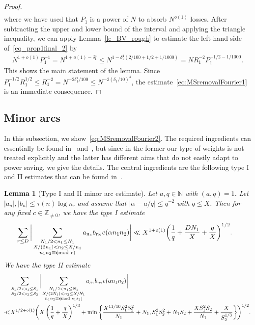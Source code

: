 \documentclass[12pt]{amsart}
\newtheorem{lemma}[theorem]{Lemma}
\theoremstyle{definition}
\theoremstyle{remark}
\numberwithin{equation}{section}
\newcommand{\1}{\mathbf{1}}
\newcommand{\Z}{{\mathbb Z}}
\let\oldpmod\pmod
\renewcommand{\pmod}[1]{\hspace{-0.12cm}\oldpmod {#1}}
\begin{document}
\begin{proof}
\begin{align}
\end{align}
where we have used that $P_1$ is a power of $N$ to absorb $N^{o(1)}$ losses. After subtracting the upper and lower bound of the interval and applying the triangle inequality, we can apply Lemma~\ref{le_BV_rough} to estimate the left-hand side of~\eqref{eq_prop1final_2} by
\begin{align*}
    N^{1+o(1)}P_1^{-1}=N^{1+o(1)-\delta_1^4}\leq N^{1-\delta_1^4(2/100+1/2+1/1000)}= NR_1^{-2}P_1^{-1/2-1/1000}.
\end{align*}
This shows the main statement of the lemma. Since $P_1^{-1/2}R_1^{1/2}\leq R_1^{-2}=N^{-2\delta_1^4/100}\leq N^{-3(\delta_1/10)^4}$, the estimate~\eqref{eq:MSremovalFourier1} is an immediate consequence.
\end{proof}


\subsection{Minor arcs}

In this subsection, we show~\eqref{eq:MSremovalFourier2}. The required ingredients can essentially be found in~\cite{matomaki} and~\cite{matomaki-shao}, but since in the former our type of weights is not treated explicitly and the latter has different aims that do not easily adapt to power saving, we give the details. The central ingredients are the following type I and II estimates that can be found in~\cite{matomaki}. 

 \begin{lemma}[Type I and II minor arc estimate] \label{lem:t1t2minor}
 Let $a,q\in \mathbb{N}$ with $(a,q)=1$. Let $|a_n|,|b_n|\leq \tau(n)\log n$, and assume that $|\alpha-a/q|\leq q^{-2}$ with $q\leq X$. Then for any fixed $c\in \Z_{\neq 0}$, we have the type I estimate 
 \begin{align}
     &\sum_{r\leq D} \bigg| \sum_{\substack{N_1/2 < n_1 \leq N_1\\ X/(2n_1)<n_2\leq X/n_1\\ n_1n_2\equiv c \pmod{r}}} a_{n_1} b_{n_2} e(\alpha n_1n_2) \bigg|\ll X^{1+o(1)} \bigg(\frac{1}{q}+\frac{DN_1}{X}+\frac{q}{X} \bigg)^{1/2}. \label{eq:typIminor}
\end{align}
We have the type II estimate 
     \begin{align}
    &\sum_{\substack{S_1/2 < s_1 \leq  S_1\\ S_2/2 < s_2 \leq  S_2}}\bigg| \sum_{\substack{N_1/2 < n_1 \leq N_1 \\ X/(2N_1) < n_2\leq X/N_1\\ n_1n_2\equiv c \pmod{s_1s_2}}} a_{n_1} b_{n_2} e(\alpha n_1n_2) \bigg|   \nonumber\\
      \ll&  X^{1/2+o(1)}\bigg(X\left(\frac{1}{q}+\frac{q}{X}\right)^{1/3}+\min\bigg\{\frac{X^{11/10} S_1^2 S_2^2}{N_1}+N_1,S_1^2 S_2^2+N_1 S_2+\frac{XS_1^2S_2}{N_1}+\frac{X}{S_2^{1/3}}\bigg\}\bigg)^{1/2}.\label{eq:typIIminor}
 \end{align}
 \end{lemma}
\end{document}
